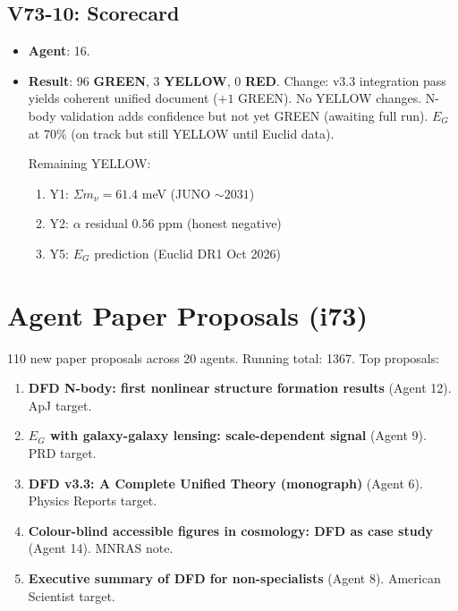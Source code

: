 \documentclass[11pt,a4paper]{article}
\newcommand{\GREEN}{\textcolor{dfdgreen}{\textbf{GREEN}}}
\newcommand{\YELLOW}{\textcolor{dfdyellow}{\textbf{YELLOW}}}
\newcommand{\RED}{\textcolor{dfdred}{\textbf{RED}}}
\begin{document}
\subsection{V73-10: Scorecard}
\begin{itemize}[nosep]
\item \textbf{Agent}: 16.
\item \textbf{Result}: 96 \GREEN, 3 \YELLOW, 0 \RED. Change: v3.3 integration pass yields coherent unified document ($+1$ GREEN). No YELLOW changes. N-body validation adds confidence but not yet GREEN (awaiting full run). $E_G$ at 70\% (on track but still YELLOW until Euclid data).

Remaining YELLOW:
\begin{enumerate}[nosep]
\item Y1: $\Sigma m_\nu = 61.4$ meV (JUNO $\sim 2031$)
\item Y2: $\alpha$ residual 0.56 ppm (honest negative)
\item Y5: $E_G$ prediction (Euclid DR1 Oct 2026)
\end{enumerate}
\end{itemize}

\section{Agent Paper Proposals (i73)}

110 new paper proposals across 20 agents. Running total: 1367. Top proposals:

\begin{enumerate}[nosep]
\item \textbf{DFD N-body: first nonlinear structure formation results} (Agent 12). ApJ target.
\item \textbf{$E_G$ with galaxy-galaxy lensing: scale-dependent signal} (Agent 9). PRD target.
\item \textbf{DFD v3.3: A Complete Unified Theory (monograph)} (Agent 6). Physics Reports target.
\item \textbf{Colour-blind accessible figures in cosmology: DFD as case study} (Agent 14). MNRAS note.
\item \textbf{Executive summary of DFD for non-specialists} (Agent 8). American Scientist target.
\end{enumerate}
\end{document}
